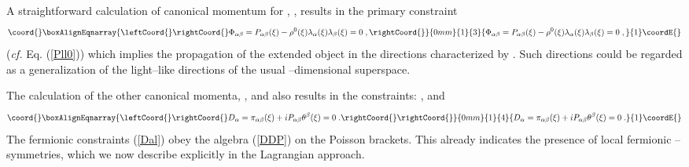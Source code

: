 \documentclass[a4paper,11pt]{article}
\begin{document}
A straightforward calculation of canonical momentum for 
\coordHE{}, 
\coordHE{}, 
results in the primary constraint 
\begin{eqnarray}\coord{}\boxAlignEqnarray{\leftCoord{}\rightCoord{}\label{Pllp} 
\Phi_{\alpha\beta}= P_{\alpha\beta}(\xi)  - 
\rho^0 (\xi) \lambda_{\alpha}(\xi)\lambda_{\beta}(\xi)= 0 \; ,  
\rightCoord{}}{0mm}{1}{3}{\Phi_{\alpha\beta}= P_{\alpha\beta}(\xi)  - 
\rho^0 (\xi) \lambda_{\alpha}(\xi)\lambda_{\beta}(\xi)= 0 \; ,  
}{1}\coordE{}\end{eqnarray}
({\it cf.} Eq. (\ref{Pll0}))
which implies the propagation of the extended object in the 
directions characterized by 
\myHighlight{$\lambda_{\alpha}(\xi)$}\coordHE{}. Such directions could be regarded as a 
\coordHE{} 
generalization of the light--like directions of the usual \coordHE{}--dimensional 
superspace. 

The calculation of the other canonical momenta, \coordHE{}, 
\coordHE{} and 
\coordHE{} also 
results in the constraints: \coordHE{}, 
\coordHE{} and 
\begin{eqnarray}\coord{}\boxAlignEqnarray{\leftCoord{}\rightCoord{}\label{Dal} 
D_{\alpha}= \pi_{\alpha\beta}(\xi)  + i P_{\alpha\beta}
\theta^{\beta}(\xi)= 0 \; . \rightCoord{}   
\rightCoord{}}{0mm}{1}{4}{D_{\alpha}= \pi_{\alpha\beta}(\xi)  + i P_{\alpha\beta}
\theta^{\beta}(\xi)= 0 \; .    
}{1}\coordE{}\end{eqnarray}
The fermionic constraints (\ref{Dal})  
 obey the algebra (\ref{DDP}) on the Poisson brackets. 
This already indicates the presence of 
\coordHE{} local fermionic \myHighlight{$\kappa$}\coordHE{}--symmetries, which we now 
describe explicitly in the Lagrangian approach. 
  
\end{document}
